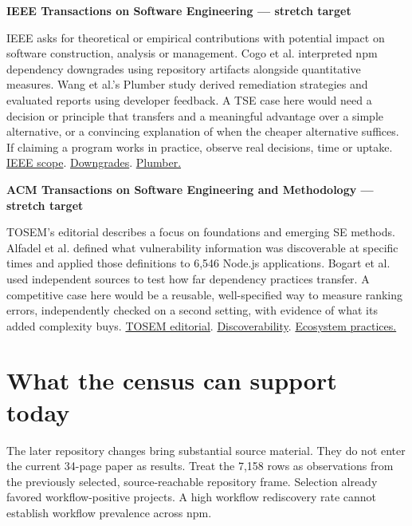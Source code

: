 \documentclass[11pt,a4paper]{article}
\newcommand{\pg}[1]{\newpage\section{\color{ink}#1}}
\newcommand{\hd}[1]{\par\textbf{\color{accent}#1}\par\nopagebreak}
\newcommand{\doi}[2]{\href{https://doi.org/#1}{#2}}
\begin{document}
\hd{IEEE Transactions on Software Engineering — stretch target}
IEEE asks for theoretical or empirical contributions with potential impact on software construction, analysis or management. Cogo et al. interpreted npm dependency downgrades using repository artifacts alongside quantitative measures. Wang et al.'s Plumber study derived remediation strategies and evaluated reports using developer feedback. A TSE case here would need a decision or principle that transfers and a meaningful advantage over a simple alternative, or a convincing explanation of when the cheaper alternative suffices. If claiming a program works in practice, observe real decisions, time or uptake. \href{https://www.computer.org/digital-library/journals/ts/cfp-ieee-transactions-on-software-engineering}{IEEE scope}. \doi{10.1109/TSE.2019.2952130}{Downgrades}. \doi{10.1109/TSE.2023.3243262}{Plumber.}

\hd{ACM Transactions on Software Engineering and Methodology — stretch target}
TOSEM's editorial describes a focus on foundations and emerging SE methods. Alfadel et al. defined what vulnerability information was discoverable at specific times and applied those definitions to 6,546 Node.js applications. Bogart et al. used independent sources to test how far dependency practices transfer. A competitive case here would be a reusable, well-specified way to measure ranking errors, independently checked on a second setting, with evidence of what its added complexity buys. \href{https://abhikrc.com/pdf/TOSEMeditorial2025.pdf}{TOSEM editorial}. \doi{10.1145/3571848}{Discoverability}. \doi{10.1145/3447245}{Ecosystem practices.}

\pg{What the census can support today}
The later repository changes bring substantial source material. They do not enter the current 34-page paper as results. Treat the 7,158 rows as observations from the previously selected, source-reachable repository frame. Selection already favored workflow-positive projects. A high workflow rediscovery rate cannot establish workflow prevalence across npm.
\end{document}
